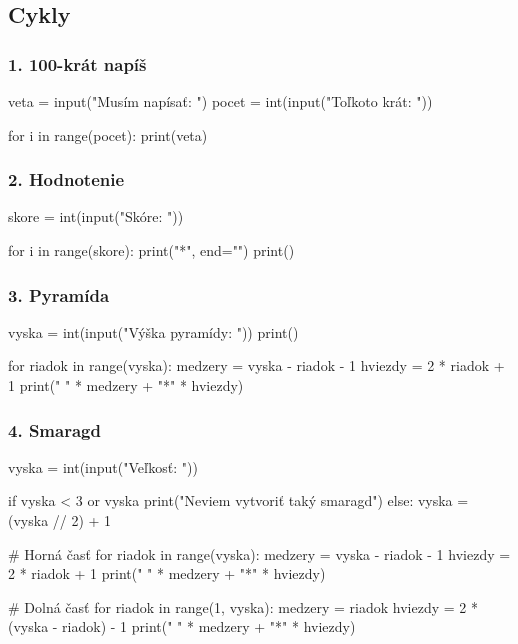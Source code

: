\subsection{Cykly}

\subsubsection*{1. 100-krát napíš}

\begin{solution}
veta = input("Musím napísať: ")
pocet = int(input("Toľkoto krát: "))

for i in range(pocet):
    print(veta)
\end{solution}

\subsubsection*{2. Hodnotenie}

\begin{solution}
skore = int(input("Skóre: "))

for i in range(skore):
    print("*", end="")
print()
\end{solution}


\subsubsection*{3. Pyramída}

\begin{solution}
vyska = int(input("Výška pyramídy: "))
print()

for riadok in range(vyska):
    medzery = vyska - riadok - 1
    hviezdy = 2 * riadok + 1
    print(" " * medzery + "*" * hviezdy)
\end{solution}

\subsubsection*{4. Smaragd}

\begin{solution}
vyska = int(input("Veľkosť: "))

if vyska < 3 or vyska %
    print("Neviem vytvoriť taký smaragd")
else:
    vyska = (vyska // 2) + 1

    # Horná časť
    for riadok in range(vyska):
        medzery = vyska - riadok - 1
        hviezdy = 2 * riadok + 1
        print(" " * medzery + "*" * hviezdy)

    # Dolná časť
    for riadok in range(1, vyska):
        medzery = riadok
        hviezdy = 2 * (vyska - riadok) - 1
        print(" " * medzery + "*" * hviezdy)
\end{solution}


